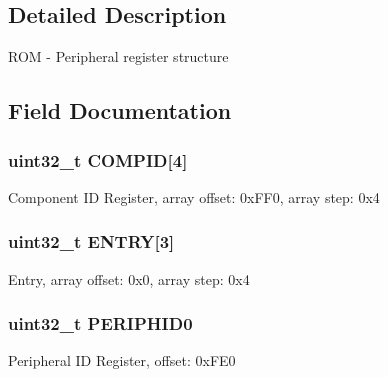 \subsection{Detailed Description}
R\+O\+M -\/ Peripheral register structure 

\subsection{Field Documentation}
\hypertarget{struct_r_o_m___mem_map_a51d2026476b6e1547beb909d07d4aa32}{}
\subsubsection[{C\+O\+M\+P\+I\+D}]{\setlength{\rightskip}{0pt plus 5cm}uint32\+\_\+t C\+O\+M\+P\+I\+D\mbox{[}4\mbox{]}}\label{struct_r_o_m___mem_map_a51d2026476b6e1547beb909d07d4aa32}
Component I\+D Register, array offset\+: 0x\+F\+F0, array step\+: 0x4 \hypertarget{struct_r_o_m___mem_map_ac9643acfd3ab0c1727bccbe356815321}{}
\subsubsection[{E\+N\+T\+R\+Y}]{\setlength{\rightskip}{0pt plus 5cm}uint32\+\_\+t E\+N\+T\+R\+Y\mbox{[}3\mbox{]}}\label{struct_r_o_m___mem_map_ac9643acfd3ab0c1727bccbe356815321}
Entry, array offset\+: 0x0, array step\+: 0x4 \hypertarget{struct_r_o_m___mem_map_a132adcf08b28d082698e505ef4cd84ab}{}
\subsubsection[{P\+E\+R\+I\+P\+H\+I\+D0}]{\setlength{\rightskip}{0pt plus 5cm}uint32\+\_\+t P\+E\+R\+I\+P\+H\+I\+D0}\label{struct_r_o_m___mem_map_a132adcf08b28d082698e505ef4cd84ab}
Peripheral I\+D Register, offset\+: 0x\+F\+E0 \hypertarget{struct_r_o_m___mem_map_addf6cf7faa9485773a8f5ffd1d243667}{}
